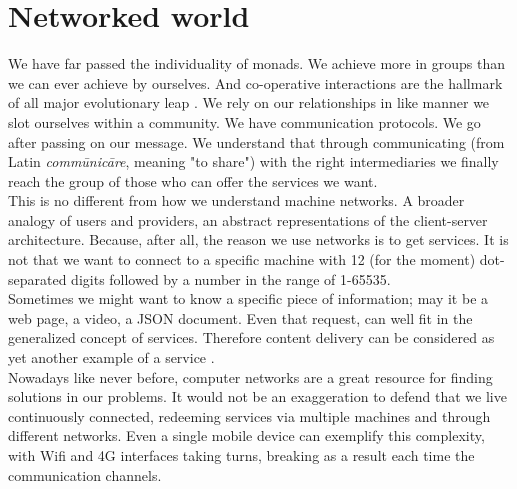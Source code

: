 \newpage
\section{Networked world}
We have far passed the individuality of monads.
We achieve more in groups than we can ever achieve by ourselves.
And co-operative interactions are the hallmark of all major evolutionary leap \cite{Christakis2011}.
We rely on our relationships in like manner we slot ourselves within a community.
We have communication protocols.
We go after passing on our message.
We understand that through communicating (from Latin \emph{comm\={u}nic\={a}re}, meaning "to share") with the right intermediaries we finally reach the group of those who can offer the services we want.
\\ \indent This is no different from how we understand machine networks.
A broader analogy of users and providers, an abstract representations of the client-server architecture.
Because, after all, the reason we use networks is to get services.
It is not that we want to connect to a specific machine with 12 (for the moment) dot-separated digits followed by a number in the range of 1-65535.
\\ \indent Sometimes we might want to know a specific piece of information; may it be a web page, a video, a JSON document.
Even that request, can well fit in the generalized concept of services.
Therefore content delivery can be considered as yet another example of a service \cite{Braun2011}.
\\ \indent Nowadays like never before, computer networks are a great resource for finding solutions in our problems.
It would not be an exaggeration to defend that we live continuously connected, redeeming services via multiple machines and through different networks.
Even a single mobile device can exemplify this complexity, with Wifi and 4G interfaces taking turns, breaking as a result each time the communication channels.

\iffalse
\subsection{Modern consumer networks}
512kbps download vs 128kbps upload speed.
This was the killer plan in the beginning of the ADSL era.
At a ratio of 4:1, ISPs \nomenclature{ISP}{Internet Service Provider} had pointed out a basic characteristic of the Internet: \emph{as a user you are expected to consume rather than offer a service or create content}.
\\ \indent Reflecting the way consumption economics is working in the real world, in the Internet it is easy to spot right on the huge service providers who circulate network services today.
In an average day, more than 60 percent of all Web-enabled devices exchange traffic with Google's servers \footnote{{\url{http://www.cnet.com/news/google-sets-internet-record-with-25-percent-of-u-s-traffic/}, accessed on May 2014}}.
Likewise, Netflix video streaming provider, which represents one third of all down-stream traffic \footnote{\url{http://www.hollywoodreporter.com/news/video-accounts-53-percent-internet-655203}, accessed on May 2014}.
\\ \indent Still, 


\subsection{Metropolitan and P2P networks}
sharing economy 
virtual currencies
crypto-currencies like bitcoin
Bittorrent only 4\% of global traffic
\fi